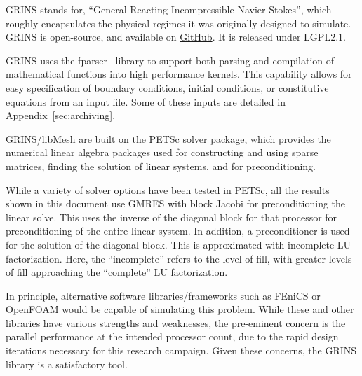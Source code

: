 GRINS stands for, ``General Reacting Incompressible Navier-Stokes'',
which roughly encapsulates the physical regimes it was originally
designed to simulate. GRINS is open-source, and available on
\hyperref[www.github.com/grinsfem/grins]{GitHub}. It is released 
under LGPL2.1.  


GRINS uses the fparser~\cite{fparser}
library to support both parsing and compilation of mathematical
functions into high performance kernels. This capability allows for
easy specification of boundary conditions, initial conditions, or
constitutive equations from an input file. Some of these inputs are
detailed in Appendix~\ref{sec:archiving}. 

GRINS/libMesh are built on the PETSc\cite{petsc} solver package, which
provides the numerical linear algebra packages used for constructing and
using sparse matrices, finding the solution of linear systems,
and for preconditioning.  

While a variety of solver options have been tested in PETSc, all the
results shown in this document use GMRES with block Jacobi for
preconditioning\cite{Saad:2003} the linear solve. This uses the
inverse of the diagonal block for that processor for preconditioning of
the entire linear system. In addition, a preconditioner is used for the
solution of the diagonal block. This is approximated with incomplete LU
factorization\cite{chan1997approximate}. Here, the ``incomplete'' refers 
to the level of fill, with greater levels of fill approaching
the ``complete'' LU factorization. 

In principle, alternative software libraries/frameworks such as
FEniCS\cite{AlnaesBlechta2015a} or OpenFOAM\cite{jasak2007openfoam}
would be capable of simulating this problem. While these and
other libraries have various strengths and weaknesses, the pre-eminent
concern is the parallel performance at the intended processor count, due
to the rapid design iterations necessary for this research
campaign. Given these concerns, the GRINS library is a satisfactory tool. 

